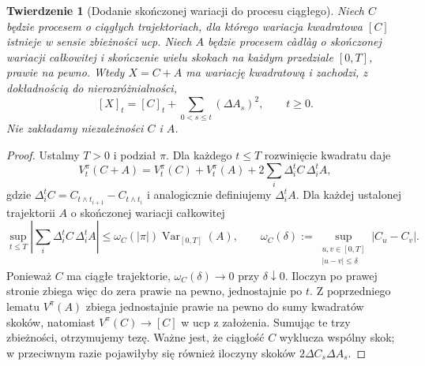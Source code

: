 \documentclass[11pt,a4paper,oneside]{report}
\numberwithin{equation}{chapter}
\theoremstyle{plain}
\newtheorem{twierdzenie}{Twierdzenie}[chapter]
\theoremstyle{definition}
\theoremstyle{remark}
\begin{document}
\begin{twierdzenie}[Dodanie skończonej wariacji do procesu ciągłego]
\label{thm:finite-variation-jumps-bracket}
Niech $C$ będzie procesem o ciągłych trajektoriach, dla którego
wariacja kwadratowa $[C]$ istnieje w sensie zbieżności ucp.
Niech $A$ będzie procesem c\`adl\`ag o skończonej wariacji
całkowitej i skończenie wielu skokach na każdym przedziale
$[0,T]$, prawie na pewno. Wtedy $X=C+A$ ma wariację
kwadratową i zachodzi, z dokładnością do nierozróżnialności,
\[
[X]_t=[C]_t+\sum_{0<s\le t}(\Delta A_s)^2,
\qquad t\ge0.
\]
Nie zakładamy niezależności $C$ i $A$.
\end{twierdzenie}
\begin{proof}
Ustalmy $T>0$ i podział $\pi$. Dla każdego $t\le T$
rozwinięcie kwadratu daje
\[
V_t^\pi(C+A)=V_t^\pi(C)+V_t^\pi(A)
 +2\sum_i\Delta_i^tC\,\Delta_i^tA,
\]
gdzie $\Delta_i^tC=C_{t\wedge t_{i+1}}-C_{t\wedge t_i}$
i analogicznie definiujemy $\Delta_i^tA$. Dla każdej
ustalonej trajektorii $A$ o skończonej wariacji całkowitej
\[
\sup_{t\le T}\left|\sum_i\Delta_i^tC\,\Delta_i^tA\right|
\le \omega_C(|\pi|)\operatorname{Var}_{[0,T]}(A),
\qquad
\omega_C(\delta):=
\sup_{\substack{u,v\in[0,T]\\|u-v|\le\delta}}|C_u-C_v|.
\]
Ponieważ $C$ ma ciągłe trajektorie, $\omega_C(\delta)\to0$
przy $\delta\downarrow0$. Iloczyn po prawej stronie zbiega
więc do zera prawie na pewno, jednostajnie po $t$.
Z poprzedniego lematu $V^\pi(A)$ zbiega jednostajnie
prawie na pewno do sumy kwadratów skoków, natomiast
$V^\pi(C)\to[C]$ w ucp z założenia.
Sumując te trzy zbieżności, otrzymujemy tezę.
Ważne jest, że ciągłość $C$ wyklucza wspólny skok;
w przeciwnym razie pojawiłyby się również iloczyny
skoków $2\Delta C_s\Delta A_s$.
\end{proof}
\end{document}
